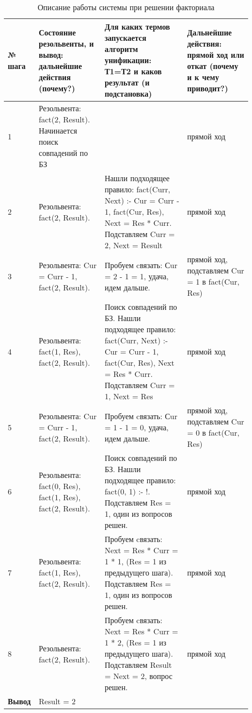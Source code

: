\begin{table}
	\caption{Описание работы системы при решении факториала}
	\begin{tabular}{|p{1.2cm}|p{5cm}|p{5cm}|p{5cm}|}
		\hline
		№ шага & Состояние резольвенты, и вывод: дальнейшие действия (почему?) & Для каких термов запускается алгоритм унификации: Т1=Т2 и каков результат (и подстановка) & Дальнейшие действия: прямой ход или откат (почему и к чему приводит?) \\
		\hline
		1 & Резольвента: \newline fact(2, Result). Начинается поиск совпадений по БЗ &  & прямой ход \\
		\hline
		2 & Резольвента: \newline fact(2, Result). & Нашли подходящее правило: fact(Curr, Next) :-  Cur = Curr - 1, fact(Cur, Res), Next = Res * Curr. Подставляем Curr = 2, Next = Result & прямой ход \\
		\hline
		3 & Резольвента: \newline Cur = Curr - 1, \newline fact(2, Result). & Пробуем cвязать: Сur = 2 - 1 = 1, удача, идем дальше.   & прямой ход, подставляем Cur = 1 в fact(Cur, Res)\\
		\hline
		4 & Резольвента: \newline fact(1, Res), \newline fact(2, Result). & Поиск совпадений по БЗ. Нашли подходящее правило: fact(Curr, Next) :-  Cur = Curr - 1, fact(Cur, Res), Next = Res * Curr. Подставляем Curr = 1, Next = Res  & прямой ход \\
		\hline
		5 & Резольвента: \newline Cur = Curr - 1, \newline fact(2, Result). & Пробуем cвязать: Сur = 1 - 1 = 0, удача, идем дальше.   & прямой ход, подставляем Cur = 0 в fact(Cur, Res) \\
		\hline
		6 & Резольвента: \newline fact(0, Res), \newline fact(1, Res), \newline fact(2, Result). & Поиск совпадений по БЗ. Нашли подходящее правило: fact(0, 1) :- !. Подставляем Res = 1, один из вопросов решен.  & прямой ход \\
		\hline
		7 & Резольвента: \newline fact(1, Res), \newline fact(2, Result). & Пробуем cвязать: Next = Res * Curr = 1 * 1, (Res = 1 из предыдущего шага). Подставляем Res = 1, один из вопросов решен.  & прямой ход \\
		\hline
		8 & Резольвента: \newline fact(2, Result). & Пробуем cвязать: Next = Res * Curr = 1 * 2, (Res = 1 из предыдущего шага). Подставляем Result = Next = 2, вопрос решен.  & прямой ход \\
		\hline
		\textbf{Вывод}& Result = 2 &  & \\
		\hline
	\end{tabular}
\end{table}

